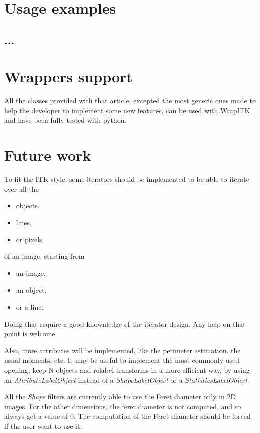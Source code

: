 \documentclass{InsightArticle}
\begin{document}
\section{Usage examples}

\subsection{...}


\section{Wrappers support}

All the classes provided with that article, excepted the most generic ones made
to help the developer to implement some new features, can be used with WrapITK,
and have been fully tested with python.

\section{Future work}

To fit the ITK style, some iterators should be implemented to be able to iterate
over all the 
\begin{itemize}
  \item objects,
  \item lines,
  \item or pixels
\end{itemize}

of an image, starting from 
\begin{itemize}
  \item an image,
  \item an object,
  \item or a line.
\end{itemize}

Doing that require a good knownledge of the iterator design. Any help on that point is
welcome.

Also, more attributes will be implemented, like the perimeter estimation, the usual moments, etc. It may be useful to implement the most commonly used opening, keep N objects and relabel transforms in a more efficient way, by using an {\em AttributeLabelObject} instead of a {\em ShapeLabelObject} or a {\em StatisticsLabelObject}.

All the {\em Shape} filters are currently able to use the Feret diameter only in 2D images. For the other dimensions, the feret diameter is not computed, and so always get a value of $0$. The computation of the Feret diameter should be forced if the user want to use it.
\end{document}
